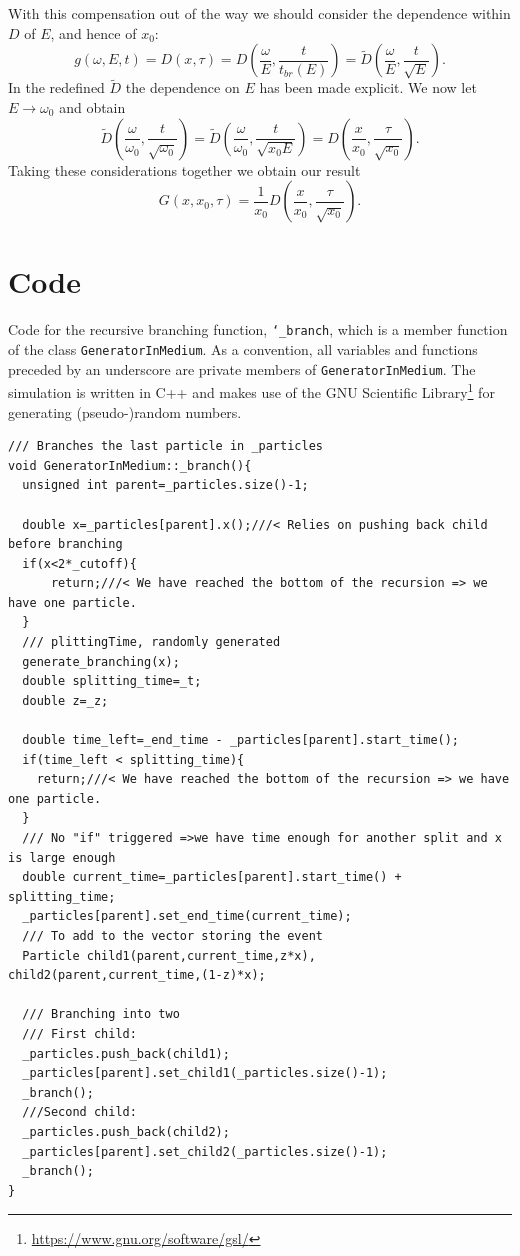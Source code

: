 \documentclass[a4paper,12pt]{article}
\numberwithin{equation}{section}
\begin{document}
With this compensation out of the way we should consider the dependence within $D$ of $E$, and hence of $x_0$:
\begin{equation}
g(\omega,E,t)=D(x,\tau)=D\left( \frac{\omega}{E},\frac{t}{t_{br}(E)}\right)=\tilde{D} \left( \frac{\omega}{E},\frac{t}{\sqrt{E}}\right).
\end{equation}
In the redefined $\tilde{D}$ the dependence on $E$ has been made explicit. We now let $E\rightarrow \omega_0$ and obtain
\begin{equation}
\tilde{D}\left( \frac{\omega}{\omega_0},\frac{t}{\sqrt{\omega_0}}\right)=\tilde{D}\left( \frac{\omega}{\omega_0},\frac{t}{\sqrt{x_0 E}}\right)=D\left( \frac{x}{x_0},\frac{\tau}{\sqrt{x_0}}\right).
\end{equation}
Taking these considerations together we obtain our result
\begin{equation}
G(x,x_0,\tau) = \frac{1}{x_0} D\left(\frac{x}{x_0},\frac{\tau}{\sqrt{x_0}}\right).
\end{equation}

\newpage
\section{Code}\label{code}
Code for the recursive branching function, {\tt \char`_branch}, which is a member function of the class {\tt GeneratorInMedium}. As a convention, all variables and functions preceded by an underscore are private members of {\tt GeneratorInMedium}. 
The simulation is written in C++ and makes use of the GNU Scientific Library\footnote{\url{https://www.gnu.org/software/gsl/}} for generating (pseudo-)random numbers.

\begin{lstlisting}
/// Branches the last particle in _particles
void GeneratorInMedium::_branch(){
  unsigned int parent=_particles.size()-1;

  double x=_particles[parent].x();///< Relies on pushing back child before branching
  if(x<2*_cutoff){
      return;///< We have reached the bottom of the recursion => we have one particle.
  }
  /// plittingTime, randomly generated
  generate_branching(x);
  double splitting_time=_t;
  double z=_z;

  double time_left=_end_time - _particles[parent].start_time();
  if(time_left < splitting_time){
    return;///< We have reached the bottom of the recursion => we have one particle.
  }
  /// No "if" triggered =>we have time enough for another split and x is large enough
  double current_time=_particles[parent].start_time() + splitting_time;
  _particles[parent].set_end_time(current_time);
  /// To add to the vector storing the event
  Particle child1(parent,current_time,z*x), child2(parent,current_time,(1-z)*x);

  /// Branching into two
  /// First child:
  _particles.push_back(child1);
  _particles[parent].set_child1(_particles.size()-1);
  _branch();
  ///Second child:
  _particles.push_back(child2);
  _particles[parent].set_child2(_particles.size()-1);
  _branch();
}
\end{lstlisting}
\end{document}
